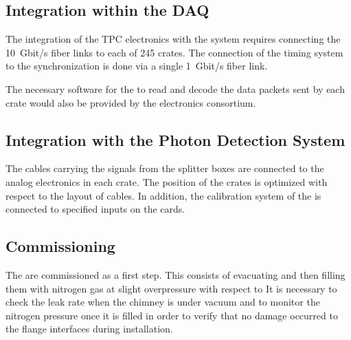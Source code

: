 \subsection{Integration within the DAQ}
\label{sec:fddp-tpc-elec-install-daq}
The integration of the \dual TPC electronics with the  system requires connecting the \SI{10}{Gbit/s} fiber links to each of \num{245}  crates. The connection of the timing system to the synchronization  is done via a single \SI{1}{Gbit/s} fiber link. 

The necessary software for the  to read and decode the data packets sent by each  crate would also be provided by the electronics consortium.   

\subsection{Integration with the Photon Detection System}
\label{sec:fddp-tpc-elec-install-pmt}
The cables carrying the  signals from the splitter boxes %
are connected to the  analog electronics in each  crate. The position of the crates %
is optimized with respect to the layout of  cables. In addition, the calibration system of the  %
is connected to specified inputs on the cards.



\subsection{Commissioning}
\label{sec:fddp-tpc-elec-comission}

The  are commissioned as a first step. This consists of evacuating and then filling them with nitrogen gas at slight overpressure with respect to %
It is necessary to check the leak rate when the chimney is under vacuum and to monitor the nitrogen pressure once it is filled in order to verify that no damage occurred to the flange interfaces during installation.

